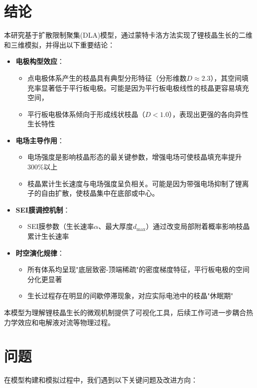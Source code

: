 \documentclass{article}
\begin{document}
\section{结论}
本研究基于扩散限制聚集(DLA)模型，通过蒙特卡洛方法实现了锂枝晶生长的二维和三维模拟，并得出以下重要结论：

\begin{itemize}
\item \textbf{电极构型效应}：
\begin{itemize}
    \item 点电极体系产生的枝晶具有典型分形特征（分形维数$D\approx2.3$），其空间填充率显著低于平行板电极。可能是因为平行板电极线性的枝晶更容易填充空间，
    \item 平行板电极体系倾向于形成线状枝晶（$D<1.0$），表现出更强的各向异性生长特性
\end{itemize}

\item \textbf{电场主导作用}：
\begin{itemize}
    \item 电场强度是影响枝晶形态的最关键参数，增强电场可使枝晶填充率提升300\%以上
    \item 枝晶累计生长速度与电场强度呈负相关。可能是因为带强电场抑制了锂离子的自由扩散，使枝晶集中在底部或中心。
\end{itemize}

\item \textbf{SEI膜调控机制}：
\begin{itemize}
    \item SEI膜参数（生长速率$\alpha$、最大厚度$d_{\text{max}}$）通过改变局部附着概率影响枝晶累计生长速率
\end{itemize}

\item \textbf{时空演化规律}：
\begin{itemize}
    \item 所有体系均呈现"底层致密-顶端稀疏"的密度梯度特征，平行板电极的空间分化更显著
    \item 生长过程存在明显的间歇停滞现象，对应实际电池中的枝晶"休眠期"
\end{itemize}
\end{itemize}

本模型为理解锂枝晶生长的微观机制提供了可视化工具，后续工作可进一步耦合热力学效应和电解液对流等物理过程。

\section{问题}
在模型构建和模拟过程中，我们遇到以下关键问题及改进方向：
\end{document}
